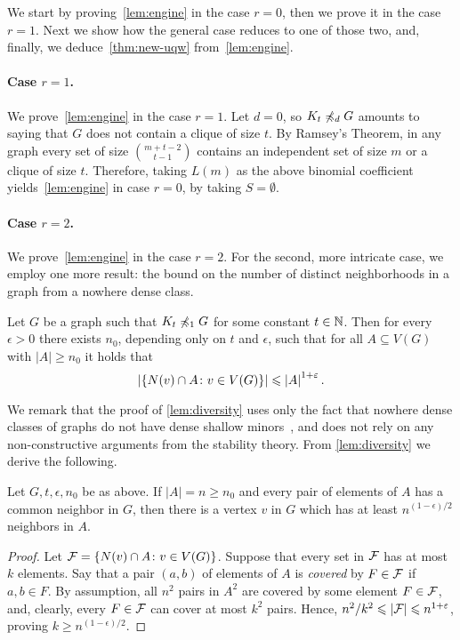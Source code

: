 We start by proving~\cref{lem:engine} in the case $r=0$,
then we prove it in the case $r=1$. Next we show how the general case reduces to one of those two, and, finally, we deduce~\cref{thm:new-uqw} from~\cref{lem:engine}.

\paragraph{Case $r=1$.}
We prove~\cref{lem:engine} in the case $r=1$.
Let $d=0$, so $K_t\not\minor_d G$ amounts to saying that $G$
does not contain a clique of size $t$. By Ramsey's Theorem, in any graph every set of size $\binom{m+t-2}{t-1}$ contains an
independent set of size $m$ or a clique of size $t$. Therefore, 
taking $L(m)$ as the above binomial coefficient yields~\cref{lem:engine} in case $r=0$, by taking $S=\emptyset$.

\paragraph{Case $r=2$.}
We prove~\cref{lem:engine} in the case $r=2$.
For the second, more intricate case, 
we employ one more result: the bound on the number of distinct neighborhoods in a graph from a nowhere dense class.

\begin{lemma}\label{lem:diversity}
Let $G$ be a graph such that $K_t\not\minor_{1} G$ for some constant $t\in \N$. 
Then for every $\epsilon>0$ there exists $n_0$, depending only on $t$ and $\epsilon$, such that for all $A\subseteq V(G)$ with $|A|\geq n_0$ it holds that
\[\abs{\{N(v)\cap A \colon v\in V(G)\}}\leq\abs{A}^{1+\epsilon}.\]
\end{lemma}



We remark that the proof of \cref{lem:diversity} uses only the fact that
nowhere dense classes of graphs do not have dense 
shallow minors~\cite{dvorak2007asymptotical,jiang2011compact}, and does not rely on any non-constructive arguments from the stability theory.
From \cref{lem:diversity} we derive the following.

\begin{corollary}\label{cor:diversity}
  Let $G,t,\epsilon,n_0$ be as above.
  If $|A|=n\ge n_0$ and every pair of elements of $A$ has a common neighbor in $G$,
  then there is a vertex $v$ in $G$ which has at least $n^{(1-\epsilon)/2}$ neighbors in $A$.
\end{corollary}
\begin{proof}Let ${\cal F}=\set{N(v)\cap A\colon v\in V(G)}$. 
  Suppose that every set in ${\cal F}$ has at most $k$ elements. 
  Say that a pair $(a,b)$ of elements of $A$ is \emph{covered} by $F\in {\cal F}$
  if  $a,b\in F$.
  By assumption, all $n^2$ pairs in $A^2$ are covered by some element $F\in {\cal F}$, and,
  clearly, every $F\in {\cal F}$ can cover at most $k^2$ pairs. 
  Hence, $n^2/k^2\le |{\cal F}|\le  n^{1+\epsilon}$, proving $k\ge n^{(1-\epsilon)/2}$.
\end{proof}

